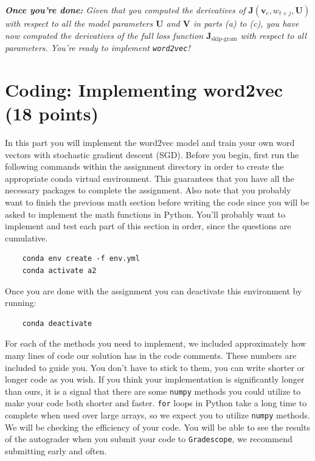 \documentclass{article}
\begin{document}
\begin{enumerate}[label=(\alph*)]
\textit{\textbf{Once you're done:} Given that you computed the derivatives of $\bm J(\bm v_c, w_{t+j}, \bm U)$ with respect to all the model parameters $\bm U$ and $\bm V$ in parts (a) to (c), you have now computed the derivatives of the full loss function $\bm J_{\text{skip-gram}}$ with respect to all parameters. You're ready to implement \texttt{word2vec}!} %

\end{enumerate}

\section{Coding: Implementing word2vec (18 points)}
In this part you will implement the word2vec model and train your own word vectors with stochastic gradient descent (SGD). Before you begin, first run the following commands within the assignment directory in order to create the appropriate conda virtual environment. This guarantees that you have all the necessary packages to complete the assignment. Also note that you probably want to finish the previous math section before writing the code since you will be asked to implement the math functions in Python. You’ll probably want to implement and test each part of this section in order, since the questions are cumulative.

\begin{verbatim}
    conda env create -f env.yml
    conda activate a2
\end{verbatim}

Once you are done with the assignment you can deactivate this environment by running:
\begin{verbatim}
    conda deactivate
\end{verbatim}

For each of the methods you need to implement, we included approximately how many lines of code our solution has in the code comments. These numbers are included to guide you. You don't have to stick to them, you can write shorter or longer code as you wish. If you think your implementation is significantly longer than ours, it is a signal that there are some \texttt{numpy} methods you could utilize to make your code both shorter and faster. \texttt{for} loops in Python take a long time to complete when used over large arrays, so we expect you to utilize \texttt{numpy} methods. We will be checking the efficiency of your code. You will be able to see the results of the autograder when you submit your code to \texttt{Gradescope}, we recommend submitting early and often.
\end{document}
